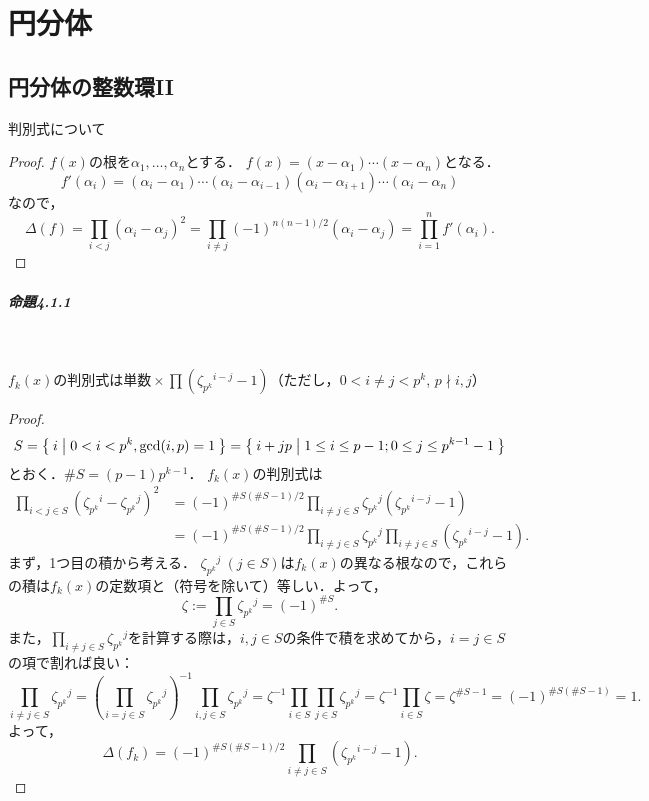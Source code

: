 \chapter{円分体}
\section{円分体の整数環II}

\begin{screen}
  \begin{lem}
    \label{disc_diff}
    判別式について
  \end{lem}
\end{screen}
\begin{proof}
  $f(x)$の根を$\alpha_1,\ldots,\alpha_n$とする．
  $f(x)=(x-\alpha_1)\cdots(x-\alpha_n)$となる．
  \[f'(\alpha_i)=(\alpha_i-\alpha_1)\cdots(\alpha_i-\alpha_{i-1})(\alpha_i-\alpha_{i+1})\cdots(\alpha_i-\alpha_n)\]
  なので，
  \[\varDelta(f)=\prod_{i< j}(\alpha_i-\alpha_j)^2=\prod_{i\neq j}(-1)^{n(n-1)/2}(\alpha_i-\alpha_j)=\prod_{i=1}^nf'(\alpha_i).\]
\end{proof}

\paragraph{命題4.1.1}~
\begin{screen}
  $f_k(x)$の判別式は$\text{単数} \times \prod (\zeta_{p^k}{}^{i-j} - 1)$（ただし，$0 < i \neq j < p^k$, $p \nmid i, j$）
\end{screen}
\begin{proof}
  \[S=\Set{i | 0< i< p^k, \gcd(i,p)=1 } = \Set{i+jp | 1\leq i\leq p-1; 0\leq j\leq p^{k-1}-1}\]
  とおく．$\#S=(p-1)p^{k-1}$．
  $f_k(x)$の判別式は
  \begin{align*}
    \prod_{i< j\in S}\left(\zeta_{p^k}{}^i-\zeta_{p^k}{}^j\right)^2 &= (-1)^{\#S(\#S-1)/2}\prod_{i\neq j\in S}\zeta_{p^k}{}^j\left(\zeta_{p^k}{}^{i-j}-1\right) \\
    &= (-1)^{\#S(\#S-1)/2}\prod_{i\neq j\in S}\zeta_{p^k}{}^j\prod_{i\neq j\in S}\left(\zeta_{p^k}{}^{i-j}-1\right).
  \end{align*}
  まず，1つ目の積から考える．
  $\zeta_{p^k}{}^j\ (j\in S)$は$f_k(x)$の異なる根なので，これらの積は$f_k(x)$の定数項と（符号を除いて）等しい．よって，
  \[\zeta:=\prod_{j\in S}\zeta_{p^k}{}^j=(-1)^{\#S}.\]
  また，$\prod_{i\neq j\in S}\zeta_{p^k}{}^j$を計算する際は，$i,j\in S$の条件で積を求めてから，$i=j\in S$の項で割れば良い：
  \[\prod_{i\neq j\in S}\zeta_{p^k}{}^j=\left(\prod_{i=j\in S}\zeta_{p^k}{}^j\right)^{-1}\prod_{i,j\in S}\zeta_{p^k}{}^j=\zeta^{-1}\prod_{i\in S}\prod_{j\in S}\zeta_{p^k}{}^j=\zeta^{-1}\prod_{i\in S}\zeta=\zeta^{\#S-1}=(-1)^{\#S(\#S -1)}=1.\]
  よって，
  \[\varDelta(f_k)=(-1)^{\#S(\#S-1)/2}\prod_{i\neq j\in S}\left(\zeta_{p^k}{}^{i-j}-1\right).\]
\end{proof}

